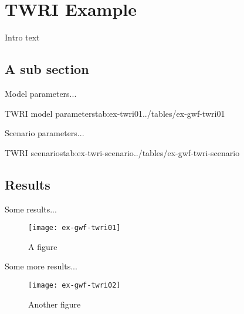 \section{\mf TWRI Example}

Intro text \citep{modflow2005}

\subsection{A sub section}

Model parameters...

\begin{StandardTable}{TWRI model parameters}{tab:ex-twri01}{../tables/ex-gwf-twri01}
\end{StandardTable}

Scenario parameters...

\begin{ScenarioTable}{TWRI scenarios}{tab:ex-twri-scenario}{../tables/ex-gwf-twri-scenario}
\end{ScenarioTable}



\subsection{Results}

Some results...

\begin{figure}[!ht]
	\begin{center}

		\texttt{[image: ex-gwf-twri01]}
		\caption{A figure}
		\label{fig:twri01}

	\end{center}
\end{figure}

Some more results...


\begin{figure}[!ht]
	\begin{center}

		\texttt{[image: ex-gwf-twri02]}
		\caption{Another figure}
		\label{fig:twri02}

	\end{center}
\end{figure}


